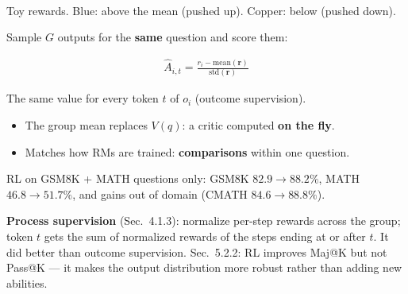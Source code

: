 \begin{minipage}[c]{0.5\linewidth}
\centering
{}\\
{\scriptsize Toy rewards. Blue: above the mean (pushed up). Copper: below (pushed down).}
\end{minipage}\hfill
\begin{minipage}[c]{0.47\linewidth}
Sample $G$ outputs for the \textbf{same} question and score them:
\begin{eqbox}
\begin{gather*}
  \hat A_{i,t} = \frac{r_i - \mathrm{mean}(\mathbf r)}{\mathrm{std}(\mathbf r)}
\end{gather*}
\end{eqbox}
{\small The same value for every token $t$ of $o_i$ (outcome supervision).}
\begin{itemize}
  \item The group mean replaces $V(q)$: a critic computed \textbf{on the fly}.
  \item Matches how RMs are trained: \textbf{comparisons} within one question.
\end{itemize}
\end{minipage}

\begin{keybox}[title={Results}]
RL on GSM8K + MATH questions only: GSM8K $82.9\to88.2\%$, MATH $46.8\to51.7\%$, and gains out of domain (CMATH $84.6\to88.8\%$).
\end{keybox}

\begin{notebox}
\textbf{Process supervision} (Sec.~4.1.3): normalize per-step rewards across the group; token $t$ gets the sum of normalized rewards of the steps ending at or after $t$. It did better than outcome supervision. Sec.~5.2.2: RL improves Maj@K but not Pass@K --- it makes the output distribution more robust rather than adding new abilities.
\end{notebox}

